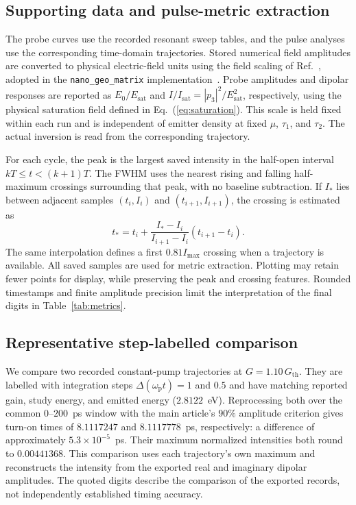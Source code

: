 \documentclass[9pt]{osa-supplemental-document}
\begin{document}
\subsection{Supporting data and pulse-metric extraction}
The probe curves use the recorded resonant sweep tables, and the pulse analyses use the corresponding time-domain trajectories. Stored numerical field amplitudes are converted to physical electric-field units using the field scaling of Ref.~\cite{Recalde:2023}, adopted in the \texttt{nano\_geo\_matrix} implementation~\cite{NanoGeoMatrix:2026}. Probe amplitudes and dipolar responses are reported as $E_0/E_{\mathrm{sat}}$ and $I/I_{\mathrm{sat}}=|p_3|^2/E_{\mathrm{sat}}^2$, respectively, using the physical saturation field defined in Eq.~(\ref{eq:saturation}). This scale is held fixed within each run and is independent of emitter density at fixed $\mu$, $\tau_1$, and $\tau_2$. The actual inversion is read from the corresponding trajectory.

For each cycle, the peak is the largest saved intensity in the half-open interval $kT\leq t<(k+1)T$. The FWHM uses the nearest rising and falling half-maximum crossings surrounding that peak, with no baseline subtraction. If $I_*$ lies between adjacent samples $(t_i,I_i)$ and $(t_{i+1},I_{i+1})$, the crossing is estimated as
\begin{equation}
t_* =t_i+\frac{I_*-I_i}{I_{i+1}-I_i}(t_{i+1}-t_i).
\label{eq:interpolation}
\end{equation}
The same interpolation defines a first $0.81I_{\max}$ crossing when a trajectory is available. All saved samples are used for metric extraction. Plotting may retain fewer points for display, while preserving the peak and crossing features. Rounded timestamps and finite amplitude precision limit the interpretation of the final digits in Table~\ref{tab:metrics}.

\subsection{Representative step-labelled comparison}
We compare two recorded constant-pump trajectories at $G=1.10\,G_{\mathrm{th}}$. They are labelled with integration steps $\Delta(\omega_{\mathrm p}t)=1$ and $0.5$ and have matching reported gain, study energy, and emitted energy ($2.8122$~eV). Reprocessing both over the common $0$--$200$~ps window with the main article's $90\%$ amplitude criterion gives turn-on times of $8.1117247$ and $8.1117778$~ps, respectively: a difference of approximately $5.3\times10^{-5}$~ps. Their maximum normalized intensities both round to $0.00441368$. This comparison uses each trajectory's own maximum and reconstructs the intensity from the exported real and imaginary dipolar amplitudes. The quoted digits describe the comparison of the exported records, not independently established timing accuracy.
\end{document}
